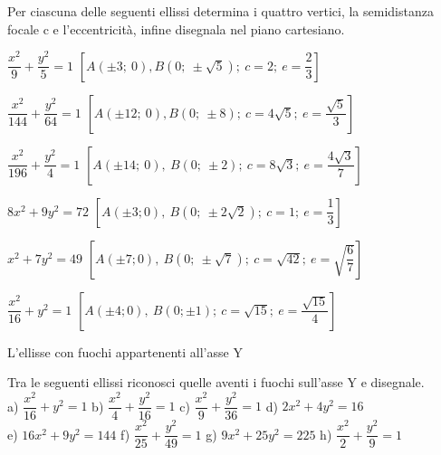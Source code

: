 % 
\begin{esercizio}
  \label{ese:div.003}
  Per ciascuna delle seguenti ellissi determina i quattro vertici, la 
semidistanza focale c e l'eccentricità, infine disegnala nel piano 
cartesiano.
  \begin{enumeratea}
\item $ \dfrac{x^{2}}{9} + \dfrac{y^{2}}{5} =1$  
\hfill $\left[A(\pm3;~0), B\left(0; ~ \pm  \sqrt{5} \right); ~c=2 ;~ e= 
\dfrac{2}{3} \right]$
\item $ \dfrac{x^{2}}{144} + \dfrac{y^{2}}{64} =1$  
\hfill $\left[A(\pm12;~ 0), B(0; ~ \pm 8); ~c=4 \sqrt{5}  ;~ e= 
\dfrac{\sqrt{5}}{3} \right]$

\item $ \dfrac{x^{2}}{196} + \dfrac{y^{2}}{4} =1$
\hfill $\left[A(\pm14;~ 0),~ B(0; ~ \pm 2);~ c=8 \sqrt{3}  ;~ e= 
\dfrac{4\sqrt{3}}{7} \right]$

\item $8{x^{2}}+9{y^{2}}=72$
\hfill  $\left[A(\pm3; 0),~ B\left(0;~ \pm 2 \sqrt{2} \right);~c=1; ~e= 
\dfrac{1}{3} \right]$

\item ${x^{2}}+7{y^{2}}=49$
\hfill $\left[A(\pm7; 0),~ B\left(0; ~ \pm  \sqrt{7} \right);~ c= \sqrt{42} 
;~ e= \sqrt{\dfrac{6}{7}} \right]$

\item $ \dfrac{x^{2}}{16} + y^{2} =1$  
\hfill $\left[A(\pm4; 0),~ B(0;  \pm 1);~ c= \sqrt{15}  ;~ e= 
\dfrac{\sqrt{15}}{4} \right]$

  \end{enumeratea}
\end{esercizio}
L'ellisse con fuochi appartenenti all'asse Y
\begin{esercizio}
  \label{ese:div.003}
   Tra le seguenti ellissi riconosci quelle aventi i fuochi sull'asse 
Y e disegnale. \\
a) $ \dfrac{x^{2}}{16} + y^{2} =1$  \hspace{1.5cm} b) $ \dfrac{x^{2}}{4} + 
\dfrac{y^{2}}{16} =1$\hspace{1.5cm}  c) $ \dfrac{x^{2}}{9} + 
\dfrac{y^{2}}{36} =1$\hspace{1.45cm} d) $2 x^{2} +4y^{2} =16$\\
e) $16 x^{2} +9 y^{2} =144$  \hspace{0.7cm} f) $ \dfrac{x^{2}}{25} + 
\dfrac{y^{2}}{49} =1$\hspace{1.6cm}  g) $9 x^{2} +25 y^{2} =225$ 
\hspace{0.6cm} h) $ \dfrac{x^{2}}{2} + \dfrac{y^{2}}{9} =1$ 
\end{esercizio}
